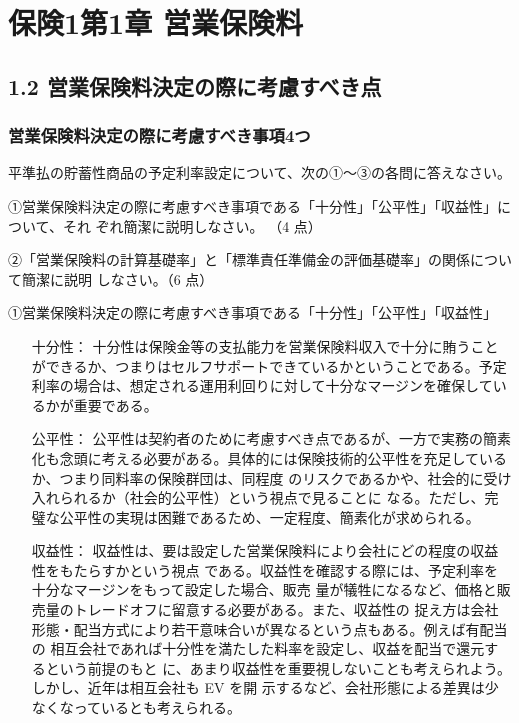 \documentclass[report,gutter=10mm,fore-edge=10mm,uplatex,dvipdfmx]{jlreq}
\begin{document}
\chapter{保険1第1章 営業保険料}

\section{1.2 営業保険料決定の際に考慮すべき点}

\subsection{営業保険料決定の際に考慮すべき事項4つ}

平準払の貯蓄性商品の予定利率設定について、次の①～③の各問に答えなさい。

①営業保険料決定の際に考慮すべき事項である「十分性」「公平性」「収益性」について、それ
ぞれ簡潔に説明しなさい。
（4 点）

②「営業保険料の計算基礎率」と「標準責任準備金の評価基礎率」の関係について簡潔に説明
しなさい。（6 点）

\answer{}
①営業保険料決定の際に考慮すべき事項である「十分性」「公平性」「収益性」

\begin{itemize}
\item[十分性：] 十分性は保険金等の支払能力を営業保険料収入で十分に賄うことができるか、つまりはセルフサポートできているかということである。予定利率の場合は、想定される運用利回りに対して十分なマージンを確保しているかが重要である。
\item[公平性：] 公平性は契約者のために考慮すべき点であるが、一方で実務の簡素化も念頭に考える必要がある。具体的には保険技術的公平性を充足しているか、つまり同料率の保険群団は、同程度
 のリスクであるかや、社会的に受け入れられるか（社会的公平性）という視点で見ることに
 なる。ただし、完璧な公平性の実現は困難であるため、一定程度、簡素化が求められる。
\item[収益性：] 収益性は、要は設定した営業保険料により会社にどの程度の収益性をもたらすかという視点
 である。収益性を確認する際には、予定利率を十分なマージンをもって設定した場合、販売
 量が犠牲になるなど、価格と販売量のトレードオフに留意する必要がある。また、収益性の
 捉え方は会社形態・配当方式により若干意味合いが異なるという点もある。例えば有配当の
 相互会社であれば十分性を満たした料率を設定し、収益を配当で還元するという前提のもと
 に、あまり収益性を重要視しないことも考えられよう。しかし、近年は相互会社も EV を開
 示するなど、会社形態による差異は少なくなっているとも考えられる。
\end{itemize}
\end{document}
